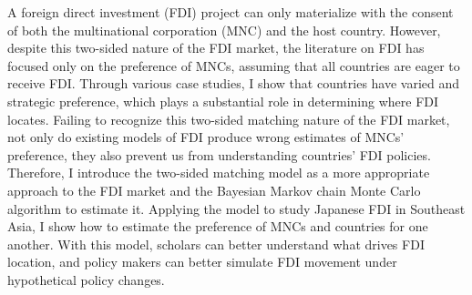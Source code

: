 \abstract

A foreign direct investment (FDI) project can only materialize with the consent of both the multinational corporation (MNC) and the host country. However, despite this two-sided nature of the FDI market, the literature on FDI has focused only on the preference of MNCs, assuming that all countries are eager to receive FDI. Through various case studies, I show that countries have varied and strategic preference, which plays a substantial role in determining where FDI locates. Failing to recognize this two-sided matching nature of the FDI market, not only do existing models of FDI produce wrong estimates of MNCs' preference, they also prevent us from understanding countries' FDI policies. Therefore, I introduce the two-sided matching model as a more appropriate approach to the FDI market and the Bayesian Markov chain Monte Carlo algorithm to estimate it. Applying the model to study Japanese FDI in Southeast Asia, I show how to estimate the preference of MNCs and countries for one another. With this model, scholars can better understand what drives FDI location, and policy makers can better simulate FDI movement under hypothetical policy changes.
